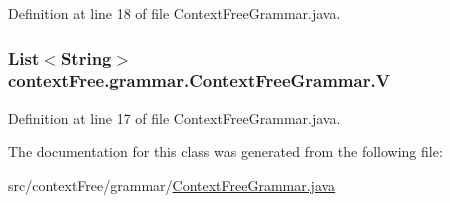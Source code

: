 Definition at line 18 of file Context\-Free\-Grammar.\-java.

\hypertarget{classcontext_free_1_1grammar_1_1_context_free_grammar_a8cecf8ee3fe6ca01f58aacf390720746}{
\subsubsection[{V}]{\setlength{\rightskip}{0pt plus 5cm}List$<$String$>$ {\bf context\-Free.\-grammar.\-Context\-Free\-Grammar.\-V}}}\label{classcontext_free_1_1grammar_1_1_context_free_grammar_a8cecf8ee3fe6ca01f58aacf390720746}


Definition at line 17 of file Context\-Free\-Grammar.\-java.



The documentation for this class was generated from the following file\-:\begin{DoxyCompactItemize}
\item 
src/context\-Free/grammar/\hyperlink{_context_free_grammar_8java}{Context\-Free\-Grammar.\-java}\end{DoxyCompactItemize}
